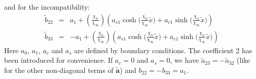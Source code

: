 \documentclass[
10pt, %
a4paper, %
oneside, %
headinclude,footinclude, %
table
]{scrartcl}
\begin{document}
and for the incompatibility:
$$
\begin{array}{rcl}
\tilde{b}_{22}&=&a_{1}+(\frac{\chi_{h}}{\chi_{\infty}})\left(a_{s1}\cosh{(\frac{\chi_{h}}{\chi_{\infty}}\tilde{x}})+a_{c1}\sinh{(\frac{\chi_{h}}{\chi_{\infty}}\tilde{x}})\right)\\
\tilde{b}_{33}&=&-a_{1}+(\frac{\chi_{h}}{\chi_{\infty}})\left(a_{s1}\cosh{(\frac{\chi_{h}}{\chi_{\infty}}\tilde{x}})+a_{c1}\sinh{(\frac{\chi_{h}}{\chi_{\infty}}\tilde{x}})\right)
\end{array}
$$
Here $a_{0}$, $a_{1}$, $a_{c}$ and $a_{s}$ are defined by boundary conditions. The coefficient 2 has been introduced for convenience.  If $a_{c}=0$ and $a_{s}=0$, we have $\tilde{a}_{23}=-\tilde{a}_{32}$ (like for the other non-diagonal terms of $\tilde{\boldsymbol{a}}$) and $b_{22}=-b_{33}=a_{1}$. 


\end{document}
